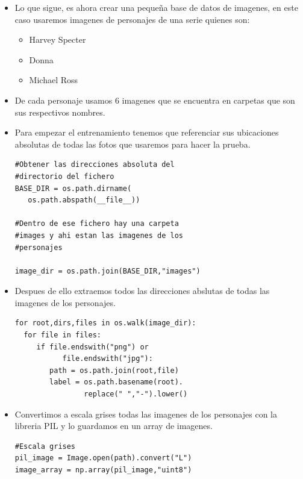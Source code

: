 \documentclass{vgtc}                          %
\begin{document}
\begin{itemize}

\item Lo que sigue, es ahora crear una pequeña base de datos de imagenes, en este caso usaremos imagenes de personajes de una serie quienes son:

	\begin{itemize}
	\item Harvey Specter
	\item Donna
	\item Michael Ross
	\end{itemize}

\item De cada personaje usamos 6 imagenes que se encuentra en carpetas que son sus respectivos nombres.

\item Para empezar el entrenamiento tenemos que referenciar sus ubicaciones absolutas de todas las fotos que usaremos para hacer la prueba.

\begin{lstlisting}
#Obtener las direcciones absoluta del 
#directorio del fichero
BASE_DIR = os.path.dirname(
   os.path.abspath(__file__))

#Dentro de ese fichero hay una carpeta 
#images y ahi estan las imagenes de los 
#personajes

image_dir = os.path.join(BASE_DIR,"images")
\end{lstlisting}


\item Despues de ello extraemos todos las direcciones abslutas de todas las imagenes de los personajes.

\begin{lstlisting}
for root,dirs,files in os.walk(image_dir):
  for file in files:
     if file.endswith("png") or 
           file.endswith("jpg"):
        path = os.path.join(root,file)
        label = os.path.basename(root).
                replace(" ","-").lower()
\end{lstlisting}

\item Convertimos a escala grises todas las imagenes de los personajes con la libreria PIL y lo guardamos en un array de imagenes.

\begin{lstlisting}
#Escala grises
pil_image = Image.open(path).convert("L") 
image_array = np.array(pil_image,"uint8")
\end{lstlisting}


\end{itemize}
\end{document}
